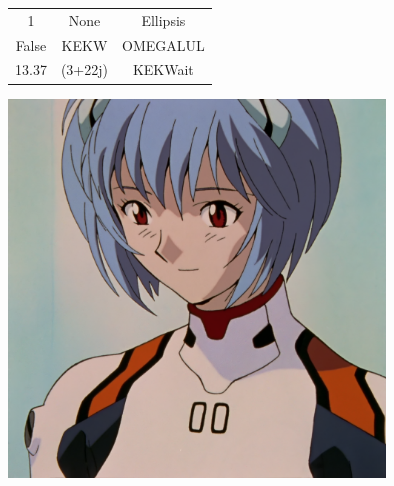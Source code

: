 \documentclass{article}
\begin{document}
\begin{center}
\begin{tabular}{ |c|c|c| } 
\hline
1 & None & Ellipsis \\False & KEKW & OMEGALUL \\13.37 & (3+22j) & KEKWait \\
\hline
\end{tabular}
\end{center}
\begin{center}
\includegraphics[width=10cm, height10cm]{./images/ayanami-rei.png}
\end{center}
\end{document}
